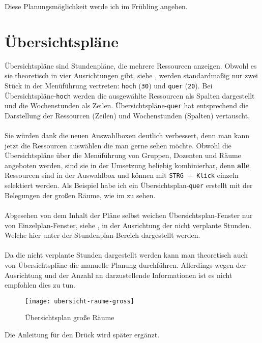 Diese Planungsmöglichkeit werde ich im Frühling angehen.

\section{Übersichtspläne}

Übersichtspläne sind Stundenpläne, die mehrere Ressourcen anzeigen. Obwohl es sie theoretisch in vier Ausrichtungen gibt, siehe , werden standardmäßig nur zwei Stück in der Menüführung vertreten: \texttt{hoch} (\texttt{30}) und \texttt{quer} (\texttt{20}). Bei Übersichtspläne-\texttt{hoch} werden die ausgewählte Ressourcen als Spalten dargestellt und die Wochenstunden als Zeilen. Übersichtspläne-\texttt{quer} hat entsprechend die Darstellung der Ressourcen (Zeilen) und Wochenstunden (Spalten) vertauscht.\\
\\
Sie würden dank die neuen Auswahlboxen deutlich verbessert, denn man kann jetzt die Ressourcen auswählen die man gerne sehen möchte. Obwohl die Übersichtspläne über die Menüführung von Gruppen, Dozenten und Räume angeboten werden, sind sie in der Umsetzung beliebig kombinierbar, denn \textbf{alle} Ressourcen sind in der Auswahlbox und können mit \texttt{STRG $+$ Klick} einzeln selektiert werden. Als Beispiel habe ich ein Übersichtsplan-\texttt{quer} erstellt mit der Belegungen der großen Räume, wie im  zu sehen.\\
\\
Abgesehen von dem Inhalt der Pläne selbst weichen Übersichtsplan-Fenster nur von Einzelplan-Fenster, siehe , in der Ausrichtung der nicht verplante Stunden. Welche hier unter der Stundenplan-Bereich dargestellt werden.\\
\\
Da die nicht verplante Stunden dargestellt werden kann man theoretisch auch von Übersichtspläne die manuelle Planung durchführen. Allerdings wegen der Ausrichtung und der Anzahl an darzustellende Informationen ist es nicht empfohlen dies zu tun.

\newpage

\begin{figure}[h]
	\centering
	\texttt{[image: ubersicht-raume-gross]}
	\vspace{-5pt}
	\caption{Übersichtsplan große Räume}
	\label{fig:ubersicht-raume-gross}
\end{figure}

Die Anleitung für den Drück wird später ergänzt.











